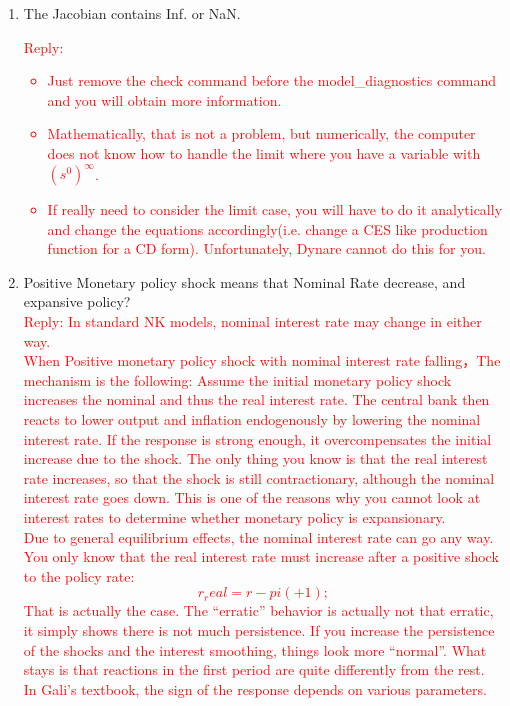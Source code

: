 \documentclass[cn,10pt,math=newtx,citestyle=gb7714-2015,bibstyle=gb7714-2015]{elegantbook}
\begin{document}
{{	\begin{enumerate}
		\item The Jacobian contains Inf. or NaN.\\
		\textcolor{red}{Reply:
			\begin{itemize}
				\item Just remove the check command before the model\_diagnostics command and you will obtain more information.
				\item Mathematically, that is not a problem, but numerically, the computer does not know how to handle the limit where you have a variable with $(s^0)^{\infty}$.
				\item If really need to consider the limit case, you will have to do it analytically and change the equations accordingly(i.e. change a CES like production function for a CD form). Unfortunately, Dynare cannot do this for you.
			\end{itemize}
		}
		\item Positive Monetary policy shock means that Nominal Rate decrease, and expansive policy?\\
		\textcolor{red}{Reply: In standard NK models, nominal interest rate may change in either way.\\
			When Positive monetary policy shock with nominal interest rate falling，The mechanism is the following: Assume the initial monetary policy shock increases the nominal and thus the real interest rate. The central bank then reacts to lower output and inflation endogenously by lowering the nominal interest rate. If the response is strong enough, it overcompensates the initial increase due to the shock. The only thing you know is that the real interest rate increases, so that the shock is still contractionary, although the nominal interest rate goes down. This is one of the reasons why you cannot look at interest rates to determine whether monetary policy is expansionary.\\
			Due to general equilibrium effects, the nominal interest rate can go any way. You only know that the real interest rate must increase after a positive shock to the policy rate:
			$$r_real=r-pi(+1);$$
			That is actually the case. The “erratic” behavior is actually not that erratic, it simply shows there is not much persistence. If you increase the persistence of the shocks and the interest smoothing, things look more “normal”. What stays is that reactions in the first period are quite differently from the rest.\\
			In Gali’s textbook, the sign of the response depends on various parameters.}

\end{enumerate}}}
\end{document}
